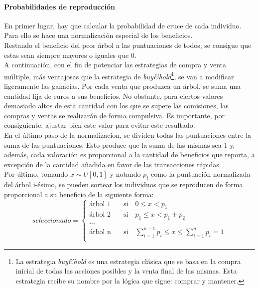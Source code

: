 \paragraph{Probabilidades de reproducci\'on}
En primer lugar, hay que calcular la probabilidad de cruce de cada individuo. Para ello se hace una normalizaci\'on especial de los beneficios.\\

Restando el beneficio del peor \'arbol a las puntuaciones de todos, se consigue que estas sean siempre mayores o iguales que 0.\\

A continuaci\'on, con el fin de potenciar las estrategias de compra y venta m\'ultiple, m\'as ventajosas que la estrategia de \textit{buy\&hold}\footnote{La estrategia \textit{buy\&hold} es una estrategia cl\'asica que se basa en la compra inicial de todas las acciones posibles y la venta final de las mismas. Esta estrategia recibe su nombre por la l\'ogica que sigue: comprar y mantener.}, se van a modificar ligeramente las ganacias. Por cada venta que produzca un \'arbol, se suma una cantidad fija de euros a sus beneficios. No obstante, para ciertos valores demasiado altos de esta cantidad con los que se supere las comisiones, las compras y ventas se realizar\'an de forma compulsiva. Es importante, por consiguiente, ajustar bien este valor para evitar este resultado.\\

En el \'ultimo paso de la normalizacion, se dividen todas las puntuaciones entre la suma de las puntuaciones. Esto produce que la suma de las mismas sea 1 y, adem\'as, cada valoraci\'on es proporcional a la cantidad de beneficios que reporta, a excepci\'on de la cantidad a\~nadida en favor de las transacciones r\'apidas.\\

Por \'ultimo, tomando $x \sim U[0,1]$ y notando $p_i$ como la puntuaci\'on normalizada del \'arbol i-\'esimo, se pueden sortear los individuos que se reproducen de forma proporcional a su beneficio de la siguiente forma:\\

\[   
seleccionado = 
     \begin{cases}
       \text{\'arbol 1} &\quad\text{si}\quad 0 \leq x < p_1\\
       \text{\'arbol 2} &\quad\text{si}\quad p_1 \leq x < p_1 + p_2\\
       \text{...} \\
       \text{\'arbol n} &\quad\text{si}\quad \sum\limits_{i=1}^{n-1} p_i \leq x \leq \sum\limits_{i=1}^{n} p_i = 1\\ 
     \end{cases}
\]

